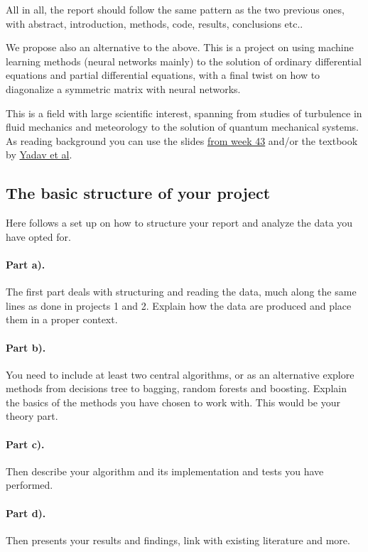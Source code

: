 \documentclass[%
oneside,                 %
final,                   %
10pt]{article}
\begin{document}
\noindent
All in all, the report should follow the same pattern as the two previous ones, with abstract, introduction, methods, code, results, conclusions etc..

We propose also an alternative to the above. This is a project on
using machine learning methods (neural networks mainly) to the
solution of ordinary differential equations and partial differential
equations, with a final twist on how to diagonalize a symmetric matrix
with neural networks.

This is a field with large scientific interest, spanning from studies
of turbulence in fluid mechanics and meteorology to the solution of
quantum mechanical systems. As reading background you can use the
slides \href{{https://compphysics.github.io/MachineLearning/doc/pub/week43/html/week42.html}}{from week
43}
and/or the textbook by \href{{https://www.springer.com/gp/book/9789401798150}}{Yadav et
al}.

\subsection{The basic structure of your project}

Here follows a set up on how to structure your report and analyze the data you have opted for.

\paragraph{Part a).}
The first part deals with structuring and reading the data, much along the same lines as done in projects 1 and 2.  Explain how the data are produced and place them in a proper context.

\paragraph{Part b).}
You need to include at least two central algorithms, or as an alternative explore methods from decisions tree to bagging, random forests and boosting. Explain the basics of the methods you have chosen to work with. This would be your theory part.

\paragraph{Part c).}
Then describe your algorithm and its implementation and tests you have performed.

\paragraph{Part d).}
Then presents your results and findings, link with existing literature and more.
\end{document}
